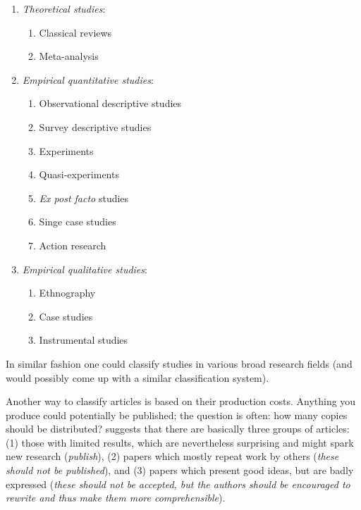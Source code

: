 \documentclass[graybox,envcountchap,sectrefs,UStrade]{svmono}
\begin{document}
\begin{enumerate}\renewcommand{\labelenumi}{\textit{\Roman{enumi}}}
  \item \emph{Theoretical studies}:
    \begin{enumerate}
      \item Classical reviews
      \item Meta-analysis
    \end{enumerate}
  \item \emph{Empirical quantitative studies}:
      \begin{enumerate}
        \item Observational descriptive studies
        \item Survey descriptive studies
        \item Experiments
        \item Quasi-experiments
        \item \emph{Ex post facto} studies
        \item Singe case studies
        \item Action research
      \end{enumerate}
  \item \emph{Empirical qualitative studies}:
       \begin{enumerate}
         \item Ethnography
         \item Case studies
         \item Instrumental studies
       \end{enumerate}
\end{enumerate}

In similar fashion one could classify studies in various broad research fields (and would possibly come up with a similar classification system).\par

Another way to classify articles is based on their production costs. Anything you produce could potentially be published; the question is often: how many copies should be distributed? \citet{Smith1990TR} suggests that there are basically three groups of articles: (1) those with limited results, which are nevertheless surprising and might spark new research (\emph{publish}), (2) papers which mostly repeat work by others (\emph{these should not be published}), and (3) papers which present good ideas, but are badly expressed (\emph{these should not be accepted, but the authors should be encouraged to rewrite and thus make them more comprehensible}).\par
\end{document}
